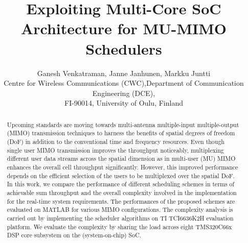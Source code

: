 \documentclass[conference,letterpaper]{./../../IEEE/IEEEtran}
\begin{document}
\title{Exploiting Multi-Core SoC Architecture for MU-MIMO Schedulers}

\author{\begin{tabular}{cc}
\multicolumn{2}{c}{Ganesh Venkatraman, Janne Janhunen, Markku Juntti}\\
Centre for Wireless Communications (CWC), & Department of Communication Engineering (DCE), \\
\multicolumn{2}{c}{FI-90014, University of Oulu, Finland}\\
\end{tabular}}

\maketitle

\begin{abstract}
Upcoming standards are moving towards multi-antenna multiple-input multiple-output (MIMO) transmission techniques to harness the benefits of spatial degrees of freedom (DoF) in addition to the conventional time and frequency resources. Even though single user MIMO transmission improves the throughput noticeably, multiplexing different user data streams across the spatial dimension as in multi-user (MU) MIMO enhances the overall cell throughput significantly. However, this improved performance depends on the efficient selection of the users to be multiplexed over the spatial DoF. In this work, we compare the performance of different scheduling schemes in terms of achievable sum throughput and the overall complexity involved in the implementation for the real-time system requirements. The performances of the proposed schemes are evaluated on MATLAB for various MIMO configurations. The complexity analysis is carried out by implementing the scheduler algorithms on TI TCI6636K2H evaluation platform. We evaluate the complexity by sharing the load across eight TMS320C66x DSP core subsystem on the (system-on-chip) SoC.
\end{abstract}

\acresetall
\end{document}
